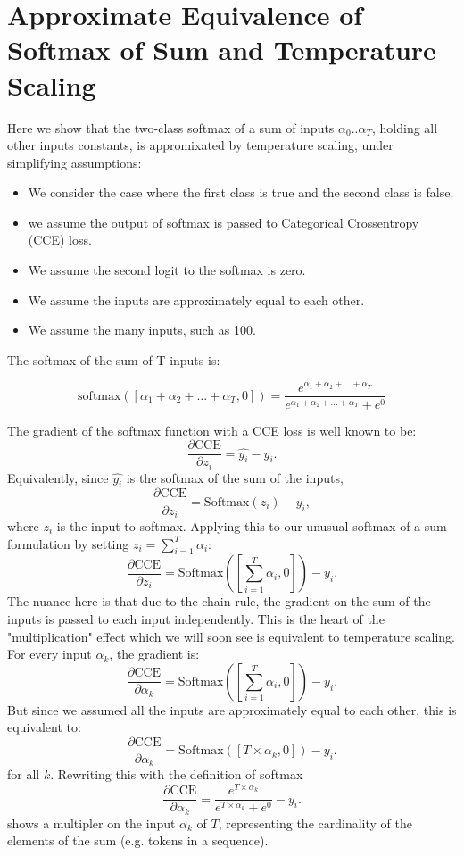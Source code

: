 \documentclass[twoside,11pt]{article}
\begin{document}
\section{Approximate Equivalence of Softmax of Sum and Temperature Scaling}

\label{app:softmax-sum-temp}

Here we show that the two-class softmax of a sum of inputs $\alpha_0..\alpha_T$, 
holding 
all other inputs constants, is appromixated by 
temperature scaling, under simplifying assumptions:

\begin{itemize}
  \item We consider the case where the first class is true and the second class is false. 
  \item we assume the output of softmax is passed to Categorical Crossentropy (CCE) loss. 
  \item We assume the second logit to the softmax is zero.
  \item We assume the inputs are approximately equal to each other. 
  \item We assume the many inputs, such as 100. 
\end{itemize}

The softmax of the sum of T inputs is:

\[
  \text{softmax}(
                 [\alpha_1 + \alpha_2 + \ldots + \alpha_T, 0])
  = 
  \frac{e^{\alpha_1 + \alpha_2 + \ldots + \alpha_T}}{e^{\alpha_1 + \alpha_2 + \ldots + \alpha_T} + e^0}
\]

The gradient of the softmax function with a CCE loss is well known to be:
\[
  \frac{\partial \text{CCE}}{\partial z_i} = \hat{y_i} - y_i.
\] 
Equivalently, since $\hat{y_i}$ is the softmax of the sum of the inputs,
\[
  \frac{\partial \text{CCE}}{\partial z_i} = \text{Softmax}(z_i) - y_i,
\] where $z_i$ is the input to softmax. 
Applying this to our unusual softmax of a sum formulation by setting 
$z_i = \sum_{i=1}^T \alpha_i$:
\[
  \frac{\partial \text{CCE}}{\partial z_i} = \text{Softmax}([\sum_{i=1}^T \alpha_i, 0]) - y_i.
\] The nuance here is that due to the chain rule, the gradient on the 
sum of the inputs is passed to each input independently. This is the heart 
of the "multiplication" effect which we will soon see is equivalent to temperature scaling.
For every input $\alpha_k$, the gradient is:
\[
  \frac{\partial \text{CCE}}{\partial \alpha_k} = \text{Softmax}([\sum_{i=1}^T \alpha_i, 0]) - y_i.
\]
But since we assumed all the inputs are approximately equal to each other,
this is equivalent to:
\[
  \frac{\partial \text{CCE}}{\partial \alpha_k} = \text{Softmax}([T \times \alpha_k, 0]) - y_i.
\] for all $k$. Rewriting this with the definition of softmax
\begin{equation}
  \label{eq:softmax-sum}
  \frac{\partial \text{CCE}}{\partial \alpha_k} = \frac{e^{T \times \alpha_k}}{e^{T \times \alpha_k} + e^0} - y_i.
\end{equation} shows a multipler on the input $\alpha_k$ of $T$, representing the cardinality 
of the elements of the sum (e.g. tokens in a sequence). 
\end{document}
